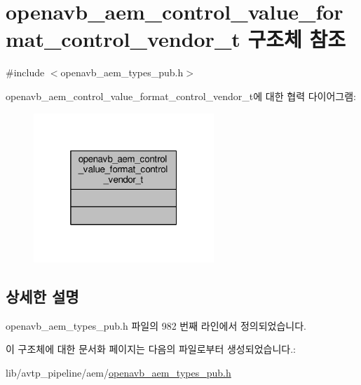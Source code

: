 \hypertarget{structopenavb__aem__control__value__format__control__vendor__t}{}\section{openavb\+\_\+aem\+\_\+control\+\_\+value\+\_\+format\+\_\+control\+\_\+vendor\+\_\+t 구조체 참조}
\label{structopenavb__aem__control__value__format__control__vendor__t}


{\ttfamily \#include $<$openavb\+\_\+aem\+\_\+types\+\_\+pub.\+h$>$}



openavb\+\_\+aem\+\_\+control\+\_\+value\+\_\+format\+\_\+control\+\_\+vendor\+\_\+t에 대한 협력 다이어그램\+:
\nopagebreak
\begin{figure}[H]
\begin{center}
\leavevmode
\includegraphics[width=193pt]{structopenavb__aem__control__value__format__control__vendor__t__coll__graph}
\end{center}
\end{figure}


\subsection{상세한 설명}


openavb\+\_\+aem\+\_\+types\+\_\+pub.\+h 파일의 982 번째 라인에서 정의되었습니다.



이 구조체에 대한 문서화 페이지는 다음의 파일로부터 생성되었습니다.\+:\begin{DoxyCompactItemize}
\item 
lib/avtp\+\_\+pipeline/aem/\hyperlink{openavb__aem__types__pub_8h}{openavb\+\_\+aem\+\_\+types\+\_\+pub.\+h}\end{DoxyCompactItemize}
